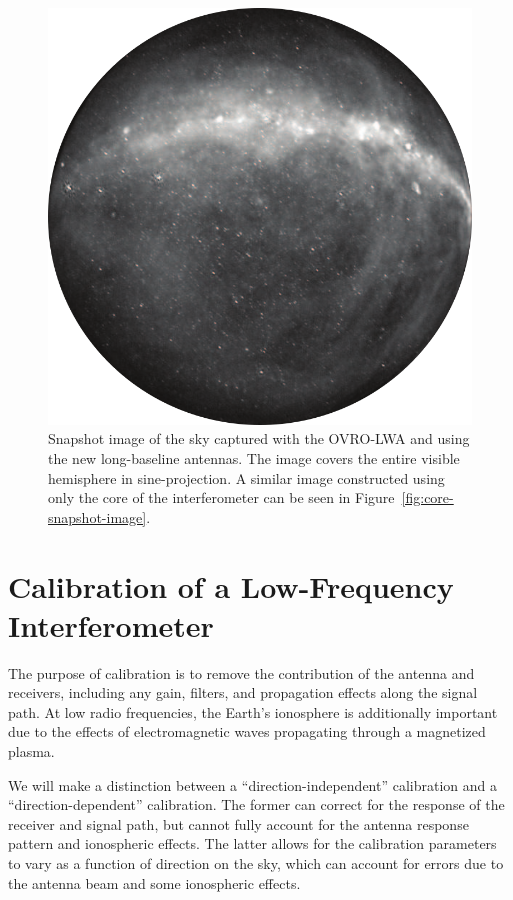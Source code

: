 \begin{bibunit}
\begin{figure}[p]
    \centering
    \includegraphics[width=\textwidth]{figures/chapter2/after-expansion}
    \caption{
        Snapshot image of the sky captured with the OVRO-LWA and using the new long-baseline
        antennas. The image covers the entire visible hemisphere in sine-projection.  A similar
        image constructed using only the core of the interferometer can be seen in
        Figure~\ref{fig:core-snapshot-image}.
    }
    \label{fig:expansion-snapshot-image}
\end{figure}

\section{Calibration of a Low-Frequency Interferometer}

The purpose of calibration is to remove the contribution of the antenna and receivers, including any
gain, filters, and propagation effects along the signal path. At low radio frequencies, the Earth's
ionosphere is additionally important due to the effects of electromagnetic waves propagating through
a magnetized plasma.

We will make a distinction between a ``direction-independent'' calibration and a
``direction-dependent'' calibration. The former can correct for the response of the receiver and
signal path, but cannot fully account for the antenna response pattern and ionospheric effects. The
latter allows for the calibration parameters to vary as a function of direction on the sky, which
can account for errors due to the antenna beam and some ionospheric effects.


\end{bibunit}
